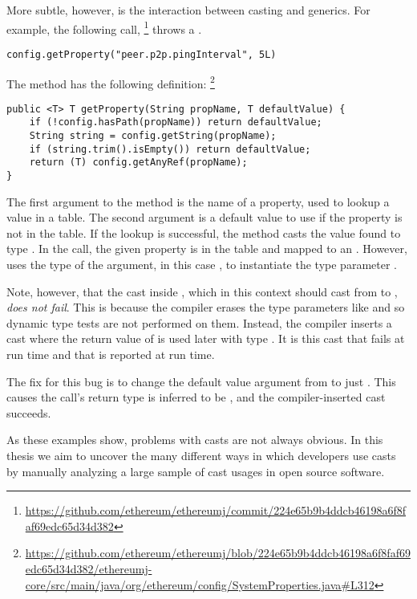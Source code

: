 More subtle, however, is the interaction between casting and generics.
For example, the following call,%
\footnote{\url{https://github.com/ethereum/ethereumj/commit/224e65b9b4ddcb46198a6f8faf69edc65d34d382}}
throws a .

\begin{verbatim}
config.getProperty("peer.p2p.pingInterval", 5L)
\end{verbatim}

The method has the following definition:%
\footnote{\url{https://github.com/ethereum/ethereumj/blob/224e65b9b4ddcb46198a6f8faf69edc65d34d382/ethereumj-core/src/main/java/org/ethereum/config/SystemProperties.java\#L312}}
\begin{verbatim}
public <T> T getProperty(String propName, T defaultValue) {
    if (!config.hasPath(propName)) return defaultValue;
    String string = config.getString(propName);
    if (string.trim().isEmpty()) return defaultValue;
    return (T) config.getAnyRef(propName);
}
\end{verbatim}
The first argument to the method is the name of a property, used to lookup a
value in a table. The second argument is a default value to use if the
property is not in the table. If the lookup is successful, the method casts
the value found to type .
In the call, the given property
 is in the table and mapped to an .
However, \java{} uses the type of the  argument, in this
case , to instantiate the type parameter .

Note, however, that the cast inside , which in this context
should cast from  to , \emph{does not fail}.
This is because the \java{} compiler erases the type
parameters like  and so dynamic type tests are not performed on them.
Instead, the compiler inserts a cast where the return value
of  is used later with type .
It is this cast that fails at run time and that is reported at run time.

The fix for this bug is to change the default value argument from 
to just . This causes the call's return type is inferred to be
, and the compiler-inserted cast succeeds.

As these examples show, problems with casts are not always obvious.
In this thesis we aim to uncover the many different ways in which developers use casts
by manually analyzing a large sample of cast usages in open source software.

